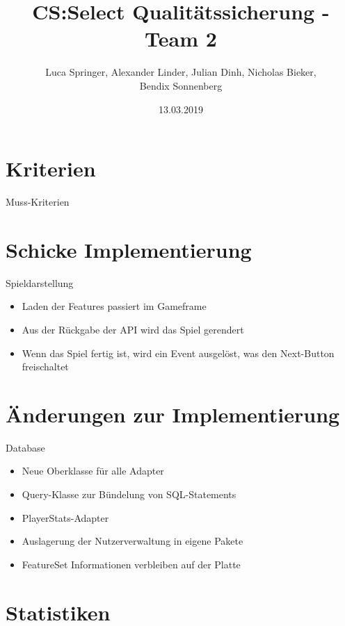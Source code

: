 \documentclass[xcolor=dvipsnames]{beamer}
\title[Team 2 - Implementierung]{CS:Select Qualitätssicherung - Team 2}
\author{Luca Springer, Alexander Linder, Julian Dinh, Nicholas Bieker,\\ Bendix Sonnenberg}
\date{13.03.2019}
\begin{document}
\begin{frame} %
  \titlepage
\end{frame}

\section{Kriterien}

\begin{frame}{Muss-Kriterien}

\end{frame}

\section{Schicke Implementierung}
\begin{frame}{Spieldarstellung}
\begin{itemize}
    \item Laden der Features passiert im Gameframe
    \item Aus der Rückgabe der API wird das Spiel gerendert
    \item Wenn das Spiel fertig ist, wird ein Event ausgelöst, was den Next-Button freischaltet
\end{itemize}
\end{frame}

\section{Änderungen zur Implementierung}
\begin{frame}{Database}
    \begin{itemize}
        \item Neue Oberklasse für alle Adapter
        \item Query-Klasse zur Bündelung von SQL-Statements
        \item PlayerStats-Adapter
        \item Auslagerung der Nutzerverwaltung in eigene Pakete
        \item FeatureSet Informationen verbleiben auf der Platte
    \end{itemize}
\end{frame}

\renewcommand{\arraystretch}{1.5}

\section{Statistiken}
\end{document}
